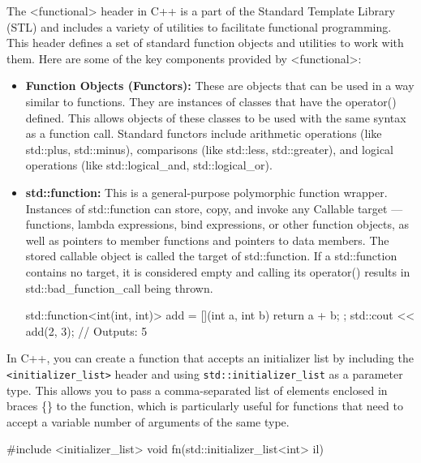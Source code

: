 \documentclass{report}
\begin{document}
\begin{concept}
    \pagebreak
    \bigbreak \noindent 
    \begin{concept}
       The <functional> header in C++ is a part of the Standard Template Library (STL) and includes a variety of utilities to facilitate functional programming. This header defines a set of standard function objects and utilities to work with them. Here are some of the key components provided by <functional>:
    \end{concept}
    \begin{itemize}
        \item \textbf{Function Objects (Functors):} These are objects that can be used in a way similar to functions. They are instances of classes that have the operator() defined. This allows objects of these classes to be used with the same syntax as a function call. Standard functors include arithmetic operations (like std::plus, std::minus), comparisons (like std::less, std::greater), and logical operations (like std::logical\_and, std::logical\_or).
        \item \textbf{std::function:} This is a general-purpose polymorphic function wrapper. Instances of std::function can store, copy, and invoke any Callable target — functions, lambda expressions, bind expressions, or other function objects, as well as pointers to member functions and pointers to data members. The stored callable object is called the target of std::function. If a std::function contains no target, it is considered empty and calling its operator() results in std::bad\_function\_call being thrown.
            \bigbreak \noindent 
            \begin{cppcode}
                std::function<int(int, int)> add = [](int a, int b) { return a + b; };
                std::cout << add(2, 3); // Outputs: 5
            \end{cppcode}
    \end{itemize}

    \pagebreak
    \bigbreak \noindent 
    In C++, you can create a function that accepts an initializer list by including the \texttt{<initializer\_list>} header and using \texttt{std::initializer\_list} as a parameter type. This allows you to pass a comma-separated list of elements enclosed in braces \{\} to the function, which is particularly useful for functions that need to accept a variable number of arguments of the same type.
    \bigbreak \noindent 
    \begin{cppcode}
#include <initializer_list>
void fn(std::initializer_list<int> il) { }


\end{cppcode}
\end{concept}
\end{document}
